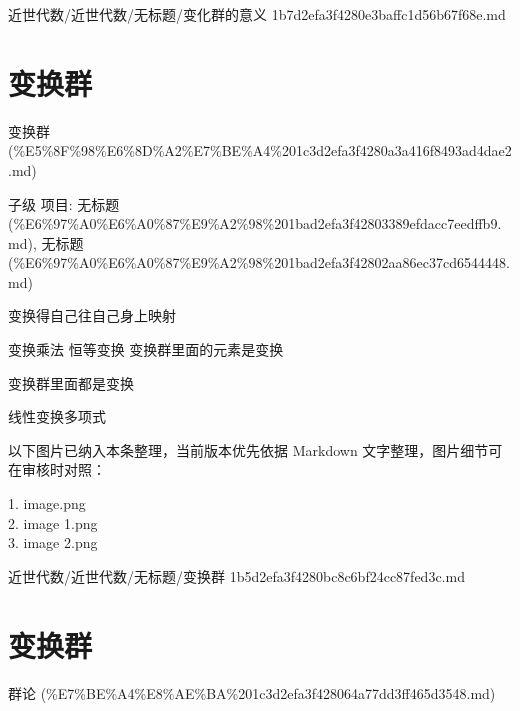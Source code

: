 \begin{note}[来源路径]

近世代数/近世代数/无标题/变化群的意义 1b7d2efa3f4280e3baffc1d56b67f68e.md

\end{note}

\section*{变换群}

\begin{note}[来源上级主题]

变换群 (\%E5\%8F\%98\%E6\%8D\%A2\%E7\%BE\%A4\%201c3d2efa3f4280a3a416f8493ad4dae2.md)

\end{note}

\begin{note}[变换群]

子级 项目: 无标题 (\%E6\%97\%A0\%E6\%A0\%87\%E9\%A2\%98\%201bad2efa3f42803389efdacc7eedffb9.md), 无标题 (\%E6\%97\%A0\%E6\%A0\%87\%E9\%A2\%98\%201bad2efa3f42802aa86ec37cd6544448.md)

变换得自己往自己身上映射

变换乘法 恒等变换     变换群里面的元素是变换

变换群里面都是变换

线性变换多项式

\end{note}

\begin{note}[关联图片]
以下图片已纳入本条整理，当前版本优先依据 Markdown 文字整理，图片细节可在审核时对照：

1. image.png\\
2. image 1.png\\
3. image 2.png\\

\end{note}

\begin{note}[来源路径]

近世代数/近世代数/无标题/变换群 1b5d2efa3f4280bc8c6bf24cc87fed3c.md

\end{note}

\section*{变换群}

\begin{note}[来源上级主题]

群论 (\%E7\%BE\%A4\%E8\%AE\%BA\%201c3d2efa3f428064a77dd3ff465d3548.md)

\end{note}

